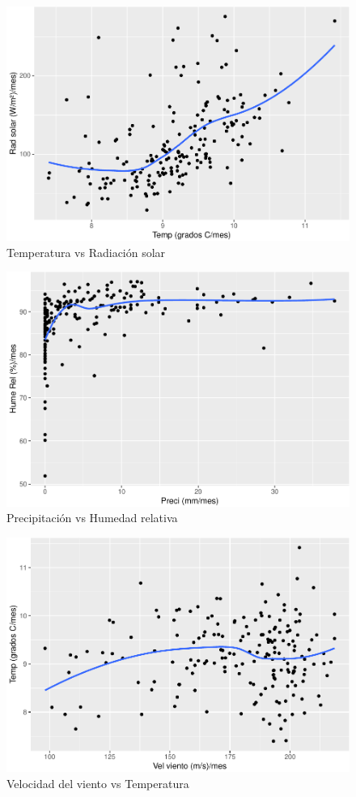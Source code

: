 \documentclass[conference,final,]{IEEEtran}
\makeatletter
\def\maxwidth{\ifdim\Gin@nat@width>\linewidth\linewidth
\else\Gin@nat@width\fi}
\let\Oldincludegraphics\includegraphics
\renewcommand{\includegraphics}[1]{\Oldincludegraphics[width=\maxwidth]{#1}}
\makeatother
\begin{document}
\begin{figure}
\centering
\includegraphics{Hidrology_files/figure-latex/unnamed-chunk-19-1.pdf}
\caption{Temperatura vs Radiación solar}
\end{figure}

\begin{figure}
\centering
\includegraphics{Hidrology_files/figure-latex/unnamed-chunk-20-1.pdf}
\caption{Precipitación vs Humedad relativa}
\end{figure}

\begin{figure}
\centering
\includegraphics{Hidrology_files/figure-latex/unnamed-chunk-21-1.pdf}
\caption{Velocidad del viento vs Temperatura}
\end{figure}
\end{document}

